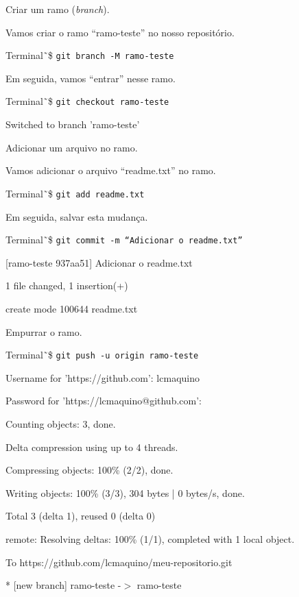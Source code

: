 \documentclass[brazil,aspectratio=169]{beamer}
\newcommand{\terminal}[1]{\textcolor{my-green}{\texttt{#1}}}
\begin{document}
\begin{frame}{Criar um ramo (\textit{branch}).}

  Vamos criar o ramo ``ramo-teste'' no nosso repositório.

  \begin{exampleblock}{Terminal}
    \~\,\$ \terminal{git branch -M ramo-teste}
  \end{exampleblock}

  Em seguida, vamos ``entrar'' nesse ramo.

  \begin{exampleblock}{Terminal}
    \~\,\$ \terminal{git checkout ramo-teste}

    Switched to branch 'ramo-teste'
  \end{exampleblock}
  
\end{frame}

\begin{frame}{Adicionar um arquivo no ramo.}

Vamos adicionar o arquivo ``readme.txt'' no ramo.

\begin{exampleblock}{Terminal}
\~\,\$ \terminal{git add readme.txt}
\end{exampleblock}

Em seguida, salvar esta mudança.

\begin{exampleblock}{Terminal}
\~\,\$ \terminal{git commit -m ``Adicionar o readme.txt''}

[ramo-teste 937aa51] Adicionar o readme.txt

1 file changed, 1 insertion(+)

create mode 100644 readme.txt
\end{exampleblock}

\end{frame}


\begin{frame}{Empurrar o ramo.}

\begin{exampleblock}{Terminal}
\~\,\$ \terminal{git push -u origin ramo-teste}

Username for 'https://github.com': lcmaquino

Password for 'https://lcmaquino@github.com': 

Counting objects: 3, done.

Delta compression using up to 4 threads.

Compressing objects: 100\% (2/2), done.

Writing objects: 100\% (3/3), 304 bytes | 0 bytes/s, done.

Total 3 (delta 1), reused 0 (delta 0)

remote: Resolving deltas: 100\% (1/1), completed with 1 local object.

To https://github.com/lcmaquino/meu-repositorio.git

* [new branch] ramo-teste -$>$ ramo-teste
\end{exampleblock}

\end{frame}
\end{document}
